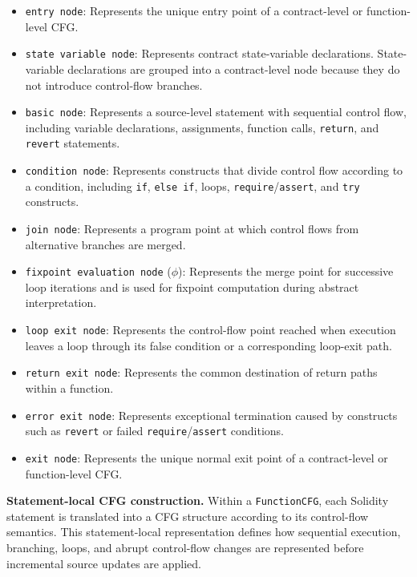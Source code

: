 \documentclass[11pt,oneside]{report}
\theoremstyle{plain}
\theoremstyle{definition}
\theoremstyle{remark}
\begin{document}
\begin{itemize}
  \item \texttt{entry node}: Represents the unique entry point of a contract-level or function-level CFG.

  \item \texttt{state variable node}: Represents contract state-variable declarations. State-variable declarations are grouped into a contract-level node because they do not introduce control-flow branches.

  \item \texttt{basic node}: Represents a source-level statement with sequential control flow, including variable declarations, assignments, function calls, \texttt{return}, and \texttt{revert} statements.

  \item \texttt{condition node}: Represents constructs that divide control flow according to a condition, including \texttt{if}, \texttt{else if}, loops, \texttt{require}/\texttt{assert}, and \texttt{try} constructs.

  \item \texttt{join node}: Represents a program point at which control flows from alternative branches are merged.

  \item \texttt{fixpoint evaluation node} (\(\phi\)): Represents the merge point for successive loop iterations and is used for fixpoint computation during abstract interpretation.

  \item \texttt{loop exit node}: Represents the control-flow point reached when execution leaves a loop through its false condition or a corresponding loop-exit path.

  \item \texttt{return exit node}: Represents the common destination of return paths within a function.

  \item \texttt{error exit node}: Represents exceptional termination caused by constructs such as \texttt{revert} or failed \texttt{require}/\texttt{assert} conditions.

  \item \texttt{exit node}: Represents the unique normal exit point of a contract-level or function-level CFG.
\end{itemize}

\noindent\textbf{Statement-local CFG construction.}
Within a \texttt{FunctionCFG}, each Solidity statement is translated into a CFG structure according to its control-flow semantics.
This statement-local representation defines how sequential execution, branching, loops, and abrupt control-flow changes are represented before incremental source updates are applied.
\end{document}
